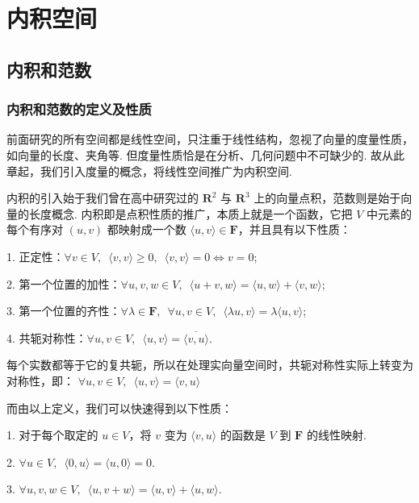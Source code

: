 \chapter{内积空间}

\section{内积和范数}
\subsection{内积和范数的定义及性质}
前面研究的所有空间都是线性空间，只注重于线性结构，忽视了向量的度量性质，如向量的长度、夹角等. 
但度量性质恰是在分析、几何问题中不可缺少的. 故从此章起，我们引入度量的概念，将线性空间推广为内积空间. 

\vspace{2ex} 

内积的引入始于我们曾在高中研究过的 $\mathbf{R}^{2}$ 与 $\mathbf{R}^{3}$ 上的向量点积，范数则是始于向量的长度概念. 
内积即是点积性质的推广，本质上就是一个函数，它把 $ V $ 中元素的每个有序对 $(u, v)$ 都映射成一个数 
$ \langle u, v \rangle \in \mathbf{F}$，并且具有以下性质：

1. 正定性：$\forall v \in V, \enspace \langle v, v \rangle \geqslant 0, \enspace \langle v, v \rangle = 0 \Leftrightarrow v = 0$; 

2. 第一个位置的加性：$\forall u, v, w \in V, \enspace \langle u + v, w \rangle = \langle u, w \rangle + \langle v, w \rangle$;

3. 第一个位置的齐性：$\forall \lambda \in \mathbf{F}, \enspace \forall u, v \in V, 
\enspace \langle \lambda u, v \rangle = \lambda \langle u, v \rangle$;

4. 共轭对称性：$\forall u, v \in V, \enspace \langle u, v \rangle = \overline{\langle v, u \rangle}$.

每个实数都等于它的复共轭，所以在处理实向量空间时，共轭对称性实际上转变为对称性，即：
$\forall u, v \in V, \enspace \langle u, v \rangle = \langle v, u \rangle$

而由以上定义，我们可以快速得到以下性质：

1. 对于每个取定的 $u \in V$，将 $ v $ 变为 $\langle v, u \rangle$ 的函数是 $ V $ 到 $\mathbf{F}$ 的线性映射.

2. $\forall u \in V, \enspace \langle 0, u \rangle = \langle u, 0 \rangle = 0$.

3. $\forall u, v, w \in V, \enspace \langle u, v + w \rangle = \langle u, v \rangle + \langle u, w \rangle$.

